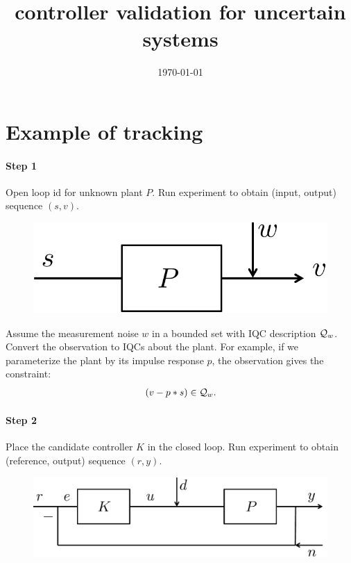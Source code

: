 \documentclass[11pt, onecolumn]{article}
\begin{document}
\title{controller validation for uncertain systems}
\date{\today}



\setcounter{page}{1}

\section{Example of tracking}

\paragraph{Step 1}
Open loop id for unknown plant $P$. Run experiment to obtain (input, output) sequence
$(s,v)$.
\begin{figure}[h!]
  \centering
  \includegraphics[width=.3\linewidth]{sys3.pdf}
\end{figure}

Assume the measurement noise $w$ in a bounded set with IQC description $\mathcal Q_w$. Convert the
observation to IQCs about the plant. For example, if we parameterize the plant by its impulse
response $p$, the observation gives the constraint:
\begin{align*}
  ( v - p*s)\in \mathcal Q_w.
\end{align*}

\paragraph{Step 2}
Place the candidate controller $K$ in the closed loop. Run experiment to obtain (reference, output)
sequence $(r, y)$.
\begin{figure}[h!]
  \centering
  \includegraphics[width=.5\linewidth]{sys2.pdf}
\end{figure}
\end{document}
